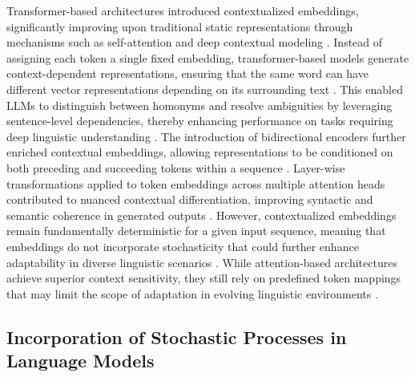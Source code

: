 Transformer-based architectures introduced contextualized embeddings, significantly improving upon traditional static representations through mechanisms such as self-attention and deep contextual modeling \cite{keith2024optimizing}. Instead of assigning each token a single fixed embedding, transformer-based models generate context-dependent representations, ensuring that the same word can have different vector representations depending on its surrounding text \cite{slaten2024probabilistic}. This enabled LLMs to distinguish between homonyms and resolve ambiguities by leveraging sentence-level dependencies, thereby enhancing performance on tasks requiring deep linguistic understanding \cite{nishikado2024mitigating}. The introduction of bidirectional encoders further enriched contextual embeddings, allowing representations to be conditioned on both preceding and succeeding tokens within a sequence \cite{beard2024adaptive}. Layer-wise transformations applied to token embeddings across multiple attention heads contributed to nuanced contextual differentiation, improving syntactic and semantic coherence in generated outputs \cite{yarie2024mitigating}. However, contextualized embeddings remain fundamentally deterministic for a given input sequence, meaning that embeddings do not incorporate stochasticity that could further enhance adaptability in diverse linguistic scenarios \cite{shofman2024negative}. While attention-based architectures achieve superior context sensitivity, they still rely on predefined token mappings that may limit the scope of adaptation in evolving linguistic environments \cite{harrington2024mitigating}.

\subsection{Incorporation of Stochastic Processes in Language Models}

